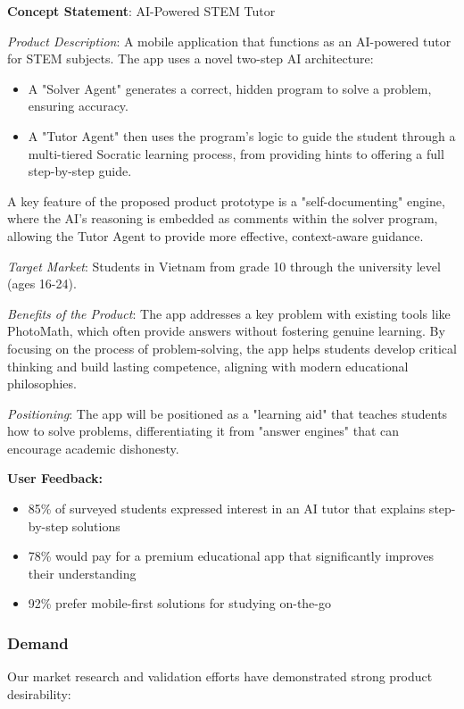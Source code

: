 \begin{mdframed}[linewidth=1pt,linecolor=black,backgroundcolor=white]
\textbf{Concept Statement}: AI-Powered STEM Tutor

\textit{Product Description}: A mobile application that functions as an AI-powered tutor for STEM subjects. The app uses
a novel two-step AI architecture:
\begin{itemize}
\item A "Solver Agent" generates a correct, hidden program to solve a problem, ensuring accuracy.
\item A "Tutor Agent" then uses the program's logic to guide the student through a multi-tiered Socratic learning process,
from providing hints to offering a full step-by-step guide.
\end{itemize}

A key feature of the proposed product prototype is a "self-documenting" engine, where the AI's reasoning is embedded as
comments within the solver program, allowing the Tutor Agent to provide more effective, context-aware guidance.

\textit{Target Market}: Students in Vietnam from grade 10 through the university level (ages 16-24).

\textit{Benefits of the Product}: The app addresses a key problem with existing tools like PhotoMath, which often provide
answers without fostering genuine learning. By focusing on the process of problem-solving, the app helps students develop
critical thinking and build lasting competence, aligning with modern educational philosophies.

\textit{Positioning}: The app will be positioned as a "learning aid" that teaches students how to solve problems,
differentiating it from "answer engines" that can encourage academic dishonesty.
\end{mdframed}

\textbf{User Feedback:}
\begin{itemize}
    \item 85\% of surveyed students expressed interest in an AI tutor that explains step-by-step solutions
    \item 78\% would pay for a premium educational app that significantly improves their understanding
    \item 92\% prefer mobile-first solutions for studying on-the-go
\end{itemize}

\subsubsection{Demand}
Our market research and validation efforts have demonstrated strong product desirability:

